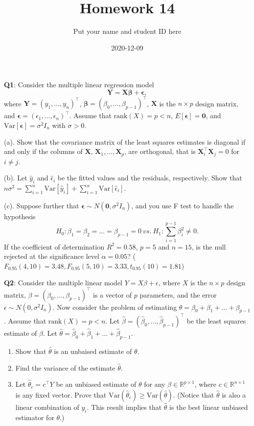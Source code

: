 \documentclass[]{article}
\title{Homework 14}
\author{Put your name and student ID here}
\date{2020-12-09}
\begin{document}
\maketitle

\textbf{Q1}: Consider the multiple linear regression model \[
\boldsymbol{Y} = \boldsymbol{X}\boldsymbol {\beta} + \boldsymbol\epsilon,
\] where \(\boldsymbol Y=(y_1,\dots,y_n)^\top\),
\(\boldsymbol\beta=(\beta_0,\dots,\beta_{p-1})^\top\), \(\boldsymbol X\)
is the \(n\times p\) design matrix, and
\(\boldsymbol\epsilon=(\epsilon_1,\dots,\epsilon_n)^\top\). Assume that
\(\mathrm{rank}(X)=p<n\), \(E[\boldsymbol\epsilon]=\boldsymbol 0\), and
\(\mathrm{Var}[\boldsymbol\epsilon]= \sigma^2 I_n\) with \(\sigma>0\).

(a). Show that the covariance matrix of the least squares estimates is
diagonal if and only if the columns of \(\boldsymbol{X}\),
\(\boldsymbol{X}_1,\dots,\boldsymbol{X}_p\), are orthogonal, that is
\(\boldsymbol{X}_i^\top \boldsymbol{X}_j=0\) for \(i\neq j\).

(b). Let \(\hat y_i\) and \(\hat\epsilon_i\) be the fitted values and
the residuals, respectively. Show that
\(n\sigma^2 = \sum_{i=1}^n \mathrm{Var}[\hat y_i]+\sum_{i=1}^n\mathrm{Var}[\hat\epsilon_i]\).

(c). Suppose further that
\(\boldsymbol\epsilon\sim N(\boldsymbol 0,\sigma^2 I_n)\), and you use F
test to handle the hypothesis
\[H_0: \beta_1=\beta_2=\dots=\beta_{p-1}=0\ vs.\ H_1:\sum_{i=1}^{p-1} \beta_i^2\neq0.\]
If the coefficient of determination \(R^2=0.58\), \(p = 5\) and
\(n=15\), is the null rejected at the significance level
\(\alpha =0.05\)?
(\(F_{0.95}(4,10)=3.48,F_{0.95}(5,10)=3.33,t_{0.95}(10)=1.81\))

\textbf{Q2}: Consider the multiple linear model
\(Y = X\beta +\epsilon\), where \(X\) is the \(n\times p\) design
matrix, \(\beta=(\beta_0,\dots,\beta_{p-1})^\top\) is a vector of \(p\)
parameters, and the error \(\epsilon\sim N(0,\sigma^2 I_n)\). Now
consider the problem of estimating
\(\theta = \beta_0+\beta_1+\dots+\beta_{p-1}\). Assume that
\(\mathrm{rank}(X)=p<n\). Let
\(\hat\beta=(\hat\beta_0,\dots,\hat\beta_{p-1})^\top\) be the least
squares estimate of \(\beta\). Let
\(\hat\theta=\hat\beta_0+\hat\beta_1+\dots+\hat\beta_{p-1}\).

\begin{enumerate}
\def\labelenumi{(\alph{enumi})}
\item
  Show that \(\hat\theta\) is an unbaised estimate of \(\theta\).
\item
  Find the variance of the estimate \(\hat\theta\).
\item
  Let \(\hat\theta_c=c^\top Y\) be an unbiased estimate of \(\theta\)
  for any \(\beta\in \mathbb{R}^{p\times 1}\), where
  \(c\in \mathbb{R}^{n\times 1}\) is any fixed vector. Prove that
  \(\mathrm{Var}(\hat\theta_c)\ge \mathrm{Var}(\hat\theta)\). (Notice
  that \(\hat\theta\) is also a linear combination of \(y_i\). This
  result implies that \(\hat\theta\) is the best linear unbiased
  estimator for \(\theta\).)
\end{enumerate}
\end{document}
